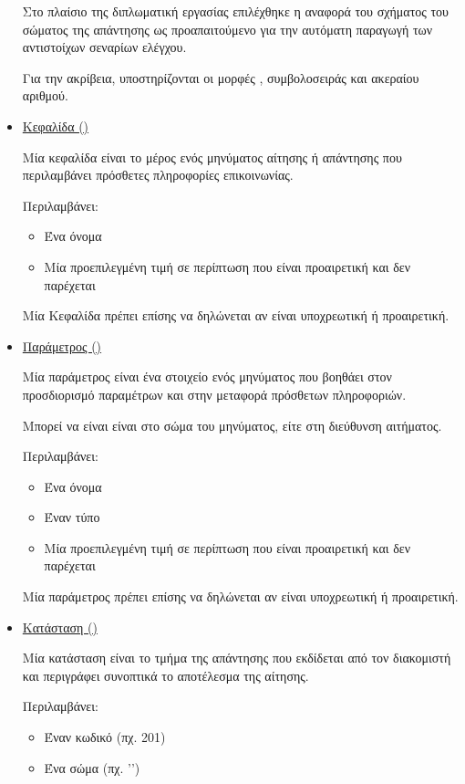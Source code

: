 \begin{itemize}
Στο πλαίσιο της διπλωματική εργασίας
επιλέχθηκε η αναφορά του σχήματος του σώματος της απάντησης ως προαπαιτούμενο για την αυτόματη παραγωγή των αντιστοίχων σεναρίων ελέγχου.

Για την ακρίβεια, υποστηρίζονται οι μορφές , συμβολοσειράς και ακεραίου αριθμού. 

\item \underline{Κεφαλίδα ()}

Μία κεφαλίδα είναι το μέρος ενός μηνύματος αίτησης ή απάντησης 
που περιλαμβάνει πρόσθετες πληροφορίες επικοινωνίας.

Περιλαμβάνει:
\begin{itemize}
    \item Ένα όνομα
    \item Μία προεπιλεγμένη τιμή σε περίπτωση που είναι προαιρετική και δεν παρέχεται
\end{itemize}

Μία Κεφαλίδα πρέπει επίσης να δηλώνεται αν είναι υποχρεωτική ή προαιρετική.

\item \underline{Παράμετρος ()}

Μία παράμετρος είναι ένα στοιχείο ενός μηνύματος
που βοηθάει στον προσδιορισμό παραμέτρων και στην μεταφορά πρόσθετων πληροφοριών.

Μπορεί να είναι είναι στο σώμα του μηνύματος, είτε στη διεύθυνση αιτήματος.

Περιλαμβάνει:
\begin{itemize}
    \item Ένα όνομα
    \item Έναν τύπο
    \item Μία προεπιλεγμένη τιμή σε περίπτωση που είναι προαιρετική και δεν παρέχεται
\end{itemize}

Μία παράμετρος πρέπει επίσης να δηλώνεται αν είναι υποχρεωτική ή προαιρετική.

\item \underline{Κατάσταση ()}

Μία κατάσταση είναι το τμήμα της απάντησης που εκδίδεται από τον διακομιστή
και περιγράφει συνοπτικά το αποτέλεσμα της αίτησης.

Περιλαμβάνει:
\begin{itemize}
    \item Έναν κωδικό (πχ. 201)
    \item Ένα σώμα (πχ. '')
\end{itemize}


\end{itemize}
